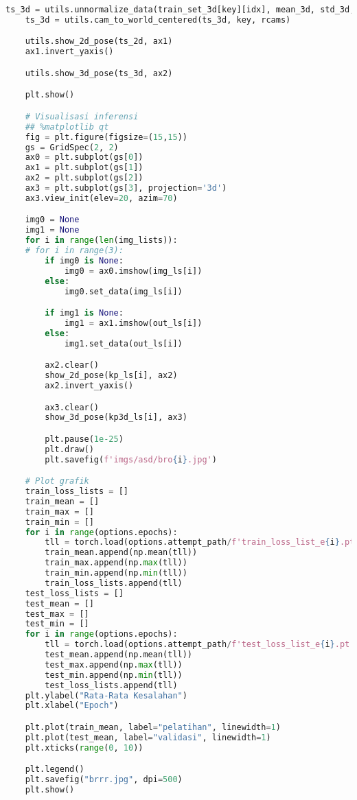\begin{lstlisting}[language=Python,multicols=2,basicstyle=\tiny,breaklines=true]
    ts_3d = utils.unnormalize_data(train_set_3d[key][idx], mean_3d, std_3d, dim_ignore_3d)[0]
    ts_3d = utils.cam_to_world_centered(ts_3d, key, rcams)

    utils.show_2d_pose(ts_2d, ax1)
    ax1.invert_yaxis()

    utils.show_3d_pose(ts_3d, ax2)

    plt.show()

    # Visualisasi inferensi
    ## %matplotlib qt
    fig = plt.figure(figsize=(15,15))
    gs = GridSpec(2, 2)
    ax0 = plt.subplot(gs[0])
    ax1 = plt.subplot(gs[1])
    ax2 = plt.subplot(gs[2])
    ax3 = plt.subplot(gs[3], projection='3d')
    ax3.view_init(elev=20, azim=70)

    img0 = None
    img1 = None
    for i in range(len(img_lists)):
    # for i in range(3):
        if img0 is None:
            img0 = ax0.imshow(img_ls[i])
        else:
            img0.set_data(img_ls[i])

        if img1 is None:
            img1 = ax1.imshow(out_ls[i])
        else:
            img1.set_data(out_ls[i])

        ax2.clear()
        show_2d_pose(kp_ls[i], ax2)
        ax2.invert_yaxis()

        ax3.clear()
        show_3d_pose(kp3d_ls[i], ax3)

        plt.pause(1e-25)
        plt.draw()
        plt.savefig(f'imgs/asd/bro{i}.jpg')

    # Plot grafik
    train_loss_lists = []
    train_mean = []
    train_max = []
    train_min = []
    for i in range(options.epochs):
        tll = torch.load(options.attempt_path/f'train_loss_list_e{i}.pt')
        train_mean.append(np.mean(tll))
        train_max.append(np.max(tll))
        train_min.append(np.min(tll))
        train_loss_lists.append(tll)
    test_loss_lists = []
    test_mean = []
    test_max = []
    test_min = []
    for i in range(options.epochs):
        tll = torch.load(options.attempt_path/f'test_loss_list_e{i}.pt')
        test_mean.append(np.mean(tll))
        test_max.append(np.max(tll))
        test_min.append(np.min(tll))
        test_loss_lists.append(tll)
    plt.ylabel("Rata-Rata Kesalahan")
    plt.xlabel("Epoch")

    plt.plot(train_mean, label="pelatihan", linewidth=1)
    plt.plot(test_mean, label="validasi", linewidth=1)
    plt.xticks(range(0, 10))

    plt.legend()
    plt.savefig("brrr.jpg", dpi=500)
    plt.show()

    \end{lstlisting}

